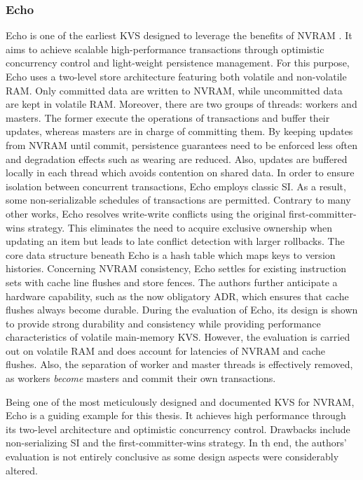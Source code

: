 \subsubsection{Echo}

Echo is one of the earliest \ac{KVS} designed to leverage the benefits of
\ac{NVRAM} \cite{bailey2013exploring}. It aims to achieve scalable
high-performance transactions through optimistic concurrency control and
light-weight persistence management. For this purpose, Echo uses a two-level
store architecture featuring both volatile and non-volatile \ac{RAM}. Only
committed data are written to \ac{NVRAM}, while uncommitted data are kept in
volatile \ac{RAM}. Moreover, there are two groups of threads: workers and
masters. The former execute the operations of transactions and buffer their
updates, whereas masters are in charge of committing them. By keeping updates
from \ac{NVRAM} until commit, persistence guarantees need to be enforced less
often and degradation effects such as wearing are reduced. Also, updates are
buffered locally in each thread which avoids contention on shared data. In order
to ensure isolation between concurrent transactions, Echo employs classic
\ac{SI}. As a result, some non-serializable schedules of transactions are
permitted. Contrary to many other works, Echo resolves write-write conflicts
using the original first-committer-wins strategy. This eliminates the need to
acquire exclusive ownership when updating an item but leads to late conflict
detection with larger rollbacks. The core data structure beneath Echo is a hash
table which maps keys to version histories. Concerning \ac{NVRAM} consistency,
Echo settles for existing instruction sets with cache line flushes and store
fences. The authors further anticipate a hardware capability, such as the now
obligatory \ac{ADR}, which ensures that cache flushes always become durable.
During the evaluation of Echo, its design is shown to provide strong durability
and consistency while providing performance characteristics of volatile
main-memory \ac{KVS}. However, the evaluation is carried out on volatile
\ac{RAM} and does account for latencies of \ac{NVRAM} and cache flushes. Also,
the separation of worker and master threads is effectively removed, as workers
\emph{become} masters and commit their own transactions.

Being one of the most meticulously designed and documented \ac{KVS} for
\ac{NVRAM}, Echo is a guiding example for this thesis. It achieves high
performance through its two-level architecture and optimistic concurrency
control. Drawbacks include non-serializing \ac{SI} and the first-committer-wins
strategy. In th end, the authors' evaluation is not entirely conclusive as some
design aspects were considerably altered.

